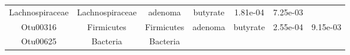 \documentclass[11pt,]{article}
\begin{document}
\begin{longtable}[]{@{}ccccccc@{}}
\begin{minipage}[t]{0.17\columnwidth}
Lachnospiraceae\strut
\end{minipage} & \begin{minipage}[t]{0.17\columnwidth}\centering\strut
Lachnospiraceae\strut
\end{minipage} & \begin{minipage}[t]{0.09\columnwidth}\centering\strut
adenoma\strut
\end{minipage} & \begin{minipage}[t]{0.11\columnwidth}\centering\strut
butyrate\strut
\end{minipage} & \begin{minipage}[t]{0.09\columnwidth}\centering\strut
1.81e-04\strut
\end{minipage} & \begin{minipage}[t]{0.09\columnwidth}\centering\strut
7.25e-03\strut
\end{minipage}\tabularnewline
\begin{minipage}[t]{0.09\columnwidth}\centering\strut
Otu00316\strut
\end{minipage} & \begin{minipage}[t]{0.17\columnwidth}\centering\strut
Firmicutes\strut
\end{minipage} & \begin{minipage}[t]{0.17\columnwidth}\centering\strut
Firmicutes\strut
\end{minipage} & \begin{minipage}[t]{0.09\columnwidth}\centering\strut
adenoma\strut
\end{minipage} & \begin{minipage}[t]{0.11\columnwidth}\centering\strut
butyrate\strut
\end{minipage} & \begin{minipage}[t]{0.09\columnwidth}\centering\strut
2.55e-04\strut
\end{minipage} & \begin{minipage}[t]{0.09\columnwidth}\centering\strut
9.15e-03\strut
\end{minipage}\tabularnewline
\begin{minipage}[t]{0.09\columnwidth}\centering\strut
Otu00625\strut
\end{minipage} & \begin{minipage}[t]{0.17\columnwidth}\centering\strut
Bacteria\strut
\end{minipage} & \begin{minipage}[t]{0.17\columnwidth}\centering\strut
Bacteria\strut
\end{minipage} & \begin{minipage}[t]{0.09\columnwidth}\centering\strut

\end{minipage}
\end{longtable}
\end{document}
